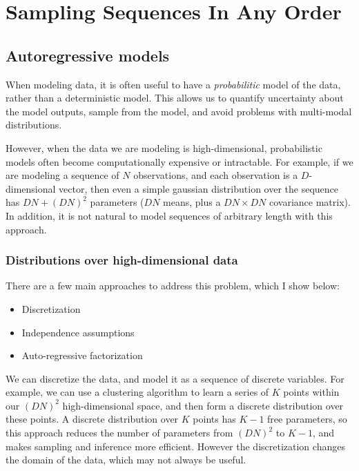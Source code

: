 \chapter{Sampling Sequences In Any Order}
\label{C:a-o-sampling}


\section{Autoregressive models}

When modeling data, it is often useful to have a \textit{probabilitic} model of the data, rather than a deterministic model. This allows us to quantify uncertainty about the model outputs, sample from the model, and avoid problems with multi-modal distributions.

However, when the data we are modeling is high-dimensional, probabilistic models often become computationally expensive or intractable. For example, if we are modeling a sequence of $N$ observations, and each observation is a $D$-dimensional vector, then even a simple gaussian distribution over the  sequence has $DN + (DN)^2$ parameters ($DN$ means, plus a $DN \times DN$ covariance matrix). In addition, it is not natural to model sequences of arbitrary length with this approach.

\subsection{Distributions over high-dimensional data}

There are a few main approaches to address this problem, which I show below:

\begin{itemize}
    \item Discretization
    \item Independence assumptions
    \item Auto-regressive factorization
\end{itemize}

We can discretize the data, and model it as a sequence of discrete variables. For example, we can use a clustering algorithm to learn a series of $K$ points within our $(DN)^2$ high-dimensional space, and then form a discrete distribution over these points. A discrete distribution over $K$ points has $K-1$ free parameters, so this approach reduces the number of parameters from $(DN)^2$ to $K-1$, and makes sampling and inference more efficient. However the discretization changes the domain of the data, which may not always be useful.

